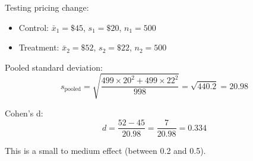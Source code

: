 \begin{example}
Testing pricing change:
\begin{itemize}
    \item Control: $\bar{x}_1 = \$45$, $s_1 = \$20$, $n_1 = 500$
    \item Treatment: $\bar{x}_2 = \$52$, $s_2 = \$22$, $n_2 = 500$
\end{itemize}

Pooled standard deviation:
\begin{equation}
s_{\text{pooled}} = \sqrt{\frac{499 \times 20^2 + 499 \times 22^2}{998}} = \sqrt{440.2} = 20.98
\end{equation}

Cohen's d:
\begin{equation}
d = \frac{52 - 45}{20.98} = \frac{7}{20.98} = 0.334
\end{equation}

This is a small to medium effect (between 0.2 and 0.5).
\end{example}

